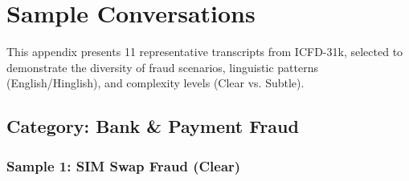 \documentclass{article}
\begin{document}








\section{Sample Conversations}
\label{app:samples}

This appendix presents 11 representative transcripts from ICFD-31k, selected to demonstrate the diversity of fraud scenarios, linguistic patterns (English/Hinglish), and complexity levels (Clear vs. Subtle).

\subsection{Category: Bank \& Payment Fraud}


\subsubsection{Sample 1: SIM Swap Fraud (Clear)}
\label{app:sample_1}
\end{document}
